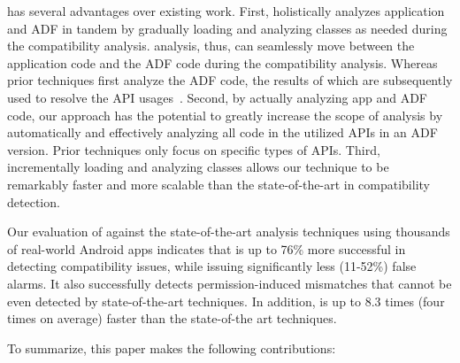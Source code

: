 \@approach has several advantages over existing work.
First, \@approach holistically analyzes application and
ADF in tandem by gradually loading and analyzing
classes as needed during the compatibility analysis.
\@approach analysis, thus, can seamlessly move between
the application code and the ADF code during the
compatibility analysis.  Whereas prior techniques first
analyze the ADF code, the results of which are
subsequently used to resolve the API
usages~\cite{huang2018understanding,linttips,
lili2018cid}. Second, by actually analyzing app and ADF
code, our approach has the potential to greatly
increase the scope of analysis by automatically and
effectively analyzing all code in the utilized APIs in
an ADF version.  Prior techniques only focus on
specific types of APIs.  Third, incrementally loading
and analyzing classes allows our technique to be
remarkably faster and more scalable than the
state-of-the-art in compatibility detection.  

Our evaluation of \@approach against the
state-of-the-art analysis techniques using thousands of
real-world Android apps indicates that 
\@approach is up to 76\% more successful in detecting
compatibility issues, while issuing significantly less
(11-52\%) false alarms.  It also successfully detects
permission-induced mismatches that cannot be even
detected by state-of-the-art techniques.  In addition,
\@approach is  up to 8.3 times (four times on average)
faster than the state-of-the art techniques. 


To summarize,
this paper makes the following contributions:
 
